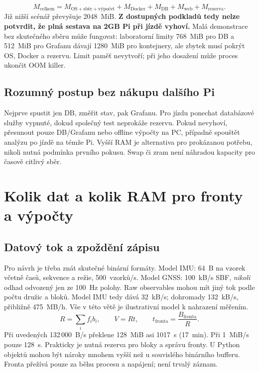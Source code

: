 \documentclass[11pt,a4paper]{article}
\begin{document}
\begin{equation}
M_{\mathrm{celkem}}=M_{\mathrm{OS+sběr+výpočet}}+M_{\mathrm{Docker}}+M_{\mathrm{DB}}+M_{\mathrm{web}}+M_{\mathrm{rezerva}}.
\end{equation}
Již nižší scénář převyšuje 2048~MiB. \textbf{Z dostupných podkladů tedy nelze potvrdit, že plná sestava na 2GB Pi při jízdě vyhoví.} Malá demonstrace bez skutečného sběru může fungovat: laboratorní limity 768~MiB pro DB a 512~MiB pro Grafanu dávají 1280~MiB pro kontejnery, ale zbytek musí pokrýt OS, Docker a rezervu. Limit paměť nevytvoří; při jeho dosažení může proces ukončit OOM killer.\cite{docker-memory}

\subsection{Rozumný postup bez nákupu dalšího Pi}
Nejprve spustit jen DB, změřit stav, pak Grafanu. Pro jízdu ponechat databázové služby vypnuté, dokud společný test neprokáže rezervu. Pokud nevyhoví, přesunout pouze DB/Grafanu nebo offline výpočty na PC, případně spouštět analýzu po jízdě na témže Pi. Vyšší RAM je alternativa pro prokázanou potřebu, nikoli nutná podmínka prvního pokusu. Swap či zram není náhradou kapacity pro časově citlivý sběr.

\clearpage
\section{Kolik dat a kolik RAM pro fronty a výpočty}
\subsection{Datový tok a zpoždění zápisu}
Pro návrh je třeba znát skutečné binární formáty. Model IMU: 64~B na vzorek včetně časů, sekvence a režie, 500~vzorků/s. Model GNSS: 100~kB/s SBF, \emph{nikoli} odhad odvozený jen ze 100~Hz polohy. Raw observables mohou mít jiný tok podle počtu družic a bloků. Model IMU tedy dává 32~kB/s; dohromady 132~kB/s, přibližně 475~MB/h. Vše v této větě je ilustrativní model k nahrazení měřením.
\begin{equation}
R=\sum_i f_i b_i,\qquad V=Rt,\qquad t_{\mathrm{fronta}}=\frac{B_{\mathrm{fronta}}}{R}.
\end{equation}
Při uvedených 132\,000~B/s překlene 128~MiB asi 1017~s (17~min). Při 1~MiB/s pouze 128~s. Prakticky je nutná rezerva pro bloky a správu fronty. U Python objektů mohou být nároky mnohem vyšší než u souvislého binárního bufferu. Fronta přežívá pouze za běhu procesu a napájení; není trvalý záznam.
\end{document}
